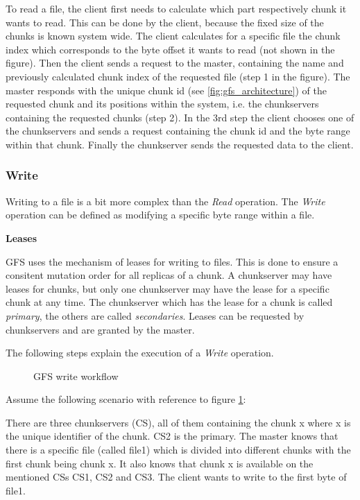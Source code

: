 \documentclass{sig-alternate}
\begin{document}
To read a file, the client first needs to calculate which part respectively chunk it wants to read. This can be done by the client, because the fixed size of the chunks is known system wide. The client calculates for a specific file the chunk index which corresponds to the byte offset it wants to read (not shown in the figure).
Then the client sends a request to the master, containing the name and previously calculated chunk index of the requested file (step 1 in the figure). The master responds with the unique chunk id (see \ref{fig:gfs_architecture}) of the requested chunk and its positions within the system, i.e. the chunkservers containing the requested chunks (step 2). In the 3rd step the client chooses one of the chunkservers and sends a request containing the chunk id and the byte range within that chunk. Finally the chunkserver sends the requested data to the client.

\subsubsection{Write}
\label{gfs_write}
Writing to a file is a bit more complex than the \textit{Read} operation. The \textit{Write} operation can be defined as modifying a specific byte range within a file.

\label{leases}
\textbf{Leases}

GFS uses the mechanism of leases for writing to files. This is done to ensure a consitent mutation order for all replicas of a chunk. A chunkserver may have leases for chunks, but only one chunkserver may have the lease for a specific chunk at any time. The chunkserver which has the lease for a chunk is called \textit{primary}, the others are called \textit{secondaries}. Leases can be requested by chunkservers and are granted by the master.

The following steps explain the execution of a \textit{Write} operation.

\begin{figure}[!hbt]
\centering
{}
\caption{GFS write workflow}
\label{fig:gfs_write}
\end{figure}

Assume the following scenario with reference to figure \ref{fig:gfs_write}:

There are three chunkservers (CS), all of them containing the chunk x where x is the unique identifier of the chunk. CS2 is the primary. The master knows that there is a specific file (called file1) which is divided into different chunks with the first chunk being chunk x. It also knows that chunk x is available on the mentioned CSs CS1, CS2 and CS3. The client wants to write to the first byte of file1.
\end{document}
